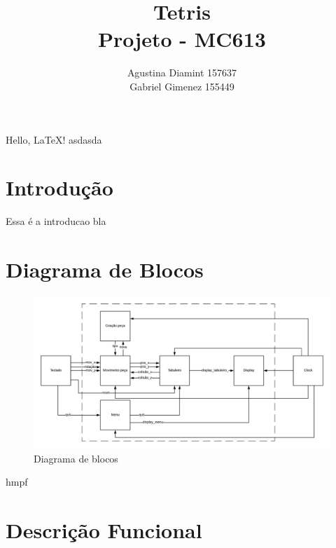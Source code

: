 \documentclass[a4paper,11pt]{article}
\begin{document}
\title{Tetris\\
	Projeto - MC613}
\author{Agustina Diamint 157637\\
 Gabriel Gimenez 155449}
\maketitle
Hello, \LaTeX! asdasda
\section{Introdu\c{c}\~ao}
Essa \'e a introducao bla
\section{Diagrama de Blocos}
\begin{figure}
\centering
\includegraphics[width =\textwidth]{Diagrama_de_blocos}
\caption{Diagrama de blocos}
\end{figure}
hmpf
\section{Descri\c{c}\~ao Funcional}
\end{document}
